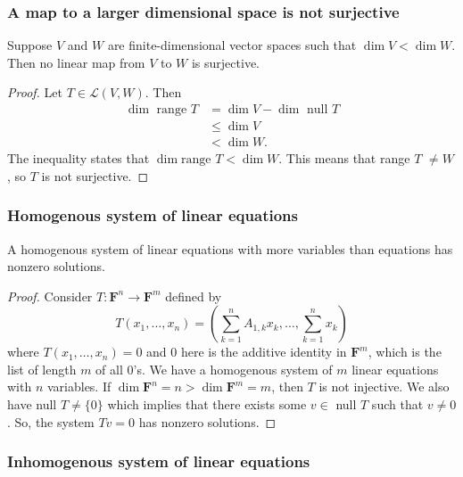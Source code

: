 \documentclass[11pt]{article}
\begin{document}
    \subsubsection{A map to a larger dimensional space is not surjective}

    Suppose $V$ and $W$ are finite-dimensional vector spaces such that \(\dim V < \dim W\). Then no linear map from $V$ to $W$ is surjective.

    \begin{proof}
        Let \(T \in \mathcal{L}(V,W)\). Then 
        \begin{align*}
            \dim \text{ range } T &= \dim V - \dim \text{ null } T \\
                                  &\leq \dim V \\
                                  &< \dim W.
        \end{align*}
        The inequality states that \(\dim \text{range } T < \dim W\). This means that range $T$ \(\neq W\), so $T$ is not surjective. 
    \end{proof}

    \subsubsection{Homogenous system of linear equations}
    
    A homogenous system of linear equations with more variables than equations has nonzero solutions. 

    \begin{proof}
        Consider \(T: \textbf{F}^n \rightarrow \textbf{F}^m\) defined by \[T(x_1, \dots, x_n) = \left( \sum_{k=1}^{n} A_{1,k} x_k, \dots, \sum_{k=1}^{n} x_k \right)\] where \(T(x_1, \dots, x_n) = 0\) and 0 here is the additive identity in \(\textbf{F}^m\), which is the list of length $m$ of all 0's. We have a homogenous system of $m$ linear equations with $n$ variables. If \(\dim \textbf{F}^n = n > \dim \textbf{F}^m = m\), then $T$ is not injective. We also have null \(T \neq \{0\}\) which implies that there exists some \(v \in\) null $T$ such that \(v \neq 0\). So, the system \(Tv = 0\) has nonzero solutions. 
    \end{proof}

    \subsubsection{Inhomogenous system of linear equations}
\end{document}
